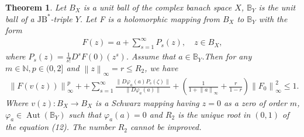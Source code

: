 \documentclass{birkjour}
\theoremstyle{plain}
\newtheorem{thm}{Theorem}
\theoremstyle{definition}
\theoremstyle{definition}
\begin{document}
\begin{thm}
	Let $B_X$ is a unit ball of the complex banach space $X$, $\mathbb{B}_Y$ is the unit ball of a $\mathrm{JB}^*$-triple $Y$. Let F is a holomorphic mapping from $B_X $ to $\mathbb{B}_Y$ with the form	
	\begin{align*}
		F(z)=a+\sum_{s=1}^{\infty} P_s(z),\quad z \in B_X,
	\end{align*}
	where $P_s(z)=\frac{1}{s!} D^sF(0)(z^s)$.
    Assume that $a \in \mathbb{B}_Y$.Then for any $m \in \mathbb{N} , p \in (0,2]$ and $\left \| z \right \| _\infty=r \le R_2$, we have
	\begin{align}
		\left \| F(v(z)) \right \| _\infty^p ++\sum_{s=1}^{\infty}	\frac{\|D\varphi_a(a)P_s(\zeta)\|}{\|D\varphi_a(a)\|}+(\frac{1}{1+\left \| a \right \|_{\infty}} +\frac{r}{1-r}  )\left \| F_0 \right \|^2_{\infty} \le 1.
	\end{align}
	Where $v(z): B_X \to B_X$ is a Schwarz mapping having $z=0$ as a zero of order $m$, $\varphi_a \in \operatorname{Aut}(\mathbb{B}_Y)$ such that $\varphi_a(a)=0$ and $R_2$ is the unique root in $(0,1)$ of the equation (12). The number $R_2$ cannot be improved.
    \end{thm}
\end{document}
